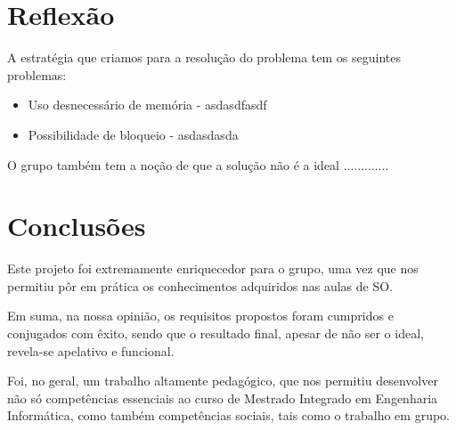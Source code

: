\documentclass[a4paper]{article}
\begin{document}
\section{Reflexão}
\label{sec:reflexao}

A estratégia que criamos para a resolução do problema tem os seguintes problemas:

\begin{itemize}
  \item{Uso desnecessário de memória - asdasdfasdf}
  \item{Possibilidade de bloqueio - asdasdasda}
\end{itemize}

O grupo também tem a noção de que a solução não é a ideal .............


\section{Conclusões}
\label{sec:conclusao}

Este projeto foi extremamente enriquecedor para o grupo, uma vez que nos permitiu pôr em prática os conhecimentos adquiridos nas aulas de SO.

Em suma, na nossa opinião, os requisitos propostos foram cumpridos e conjugados com êxito, sendo que o resultado final, apesar de não ser o ideal, revela-se apelativo e funcional.

Foi, no geral, um trabalho  altamente pedagógico, que nos permitiu desenvolver não só competências essenciais ao curso de Mestrado Integrado em Engenharia Informática, como também competências sociais, tais como o trabalho em grupo.
\end{document}
